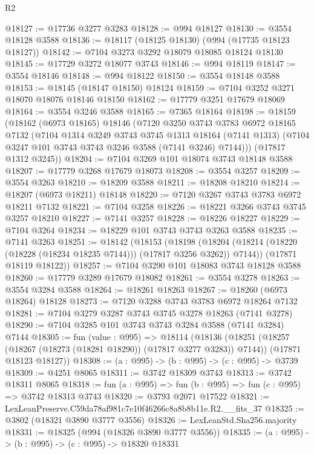 \begin{lexlean}{R2}
\begin{coremodule}
@18127 := @17736 @3277 @3283
@18128 := @994 @18127
@18130 := @3554 @18128 @3588
@18136 := @18117 (@18125 @18130) (@994 (@17735 @18123 @18127))
@18142 := @7104 @3273 @3292 @18079 @18085 @18124 @18130
@18145 := @17729 @3272 @18077 @3743
@18146 := @994 @18119
@18147 := @3554 @18146
@18148 := @994 @18122
@18150 := @3554 @18148 @3588
@18153 := @18145 (@18147 @18150) @18124
@18159 := @7104 @3252 @3271 @18070 @18076 @18146 @18150
@18162 := @17779 @3251 @17679 @18069
@18164 := @3554 @3246 @3588
@18165 := @7365 @18164
@18198 := @18159
    (@18162
      (@6973 @18165)
      @18146
      (@7120
        @3250
        @3743
        @3783
        @6972
        @18165
        @7132
        (@7104
          @1314
          @3249
          @3743
          @3745
          @1313
          @18164
          (@7141 @1313)
          (@7104 @3247 @101 @3743 @3743 @3246 @3588 (@7141 @3246) @7144)))
      (@17817 @1312 @3245))
@18204 := @7104 @3269 @101 @18074 @3743 @18148 @3588
@18207 := @17779 @3268 @17679 @18073
@18208 := @3554 @3257
@18209 := @3554 @3263
@18210 := @18209 @3588
@18211 := @18208 @18210
@18214 := @18207 (@6973 @18211) @18148
@18220 := @7120 @3267 @3743 @3783 @6972 @18211 @7132
@18221 := @7104 @3258
@18226 := @18221 @3266 @3743 @3745 @3257 @18210
@18227 := @7141 @3257
@18228 := @18226 @18227
@18229 := @7104 @3264
@18234 := @18229 @101 @3743 @3743 @3263 @3588
@18235 := @7141 @3263
@18251 := @18142
    (@18153
      (@18198 (@18204 (@18214 (@18220 (@18228 (@18234 @18235 @7144))) (@17817 @3256 @3262)) @7144))
      (@17871 @18119 @18122))
@18257 := @7104 @3290 @101 @18083 @3743 @18128 @3588
@18260 := @17779 @3289 @17679 @18082
@18261 := @3554 @3278
@18263 := @3554 @3284 @3588
@18264 := @18261 @18263
@18267 := @18260 (@6973 @18264) @18128
@18273 := @7120 @3288 @3743 @3783 @6972 @18264 @7132
@18281 := @7104 @3279 @3287 @3743 @3745 @3278 @18263 (@7141 @3278)
@18290 := @7104 @3285 @101 @3743 @3743 @3284 @3588 (@7141 @3284) @7144
@18305 := fun (value : @995) =>
  @18114
    (@18136
      (@18251 (@18257 (@18267 (@18273 (@18281 @18290)) (@17817 @3277 @3283)) @7144))
      (@17871 @18123 @18127))
@18308 := (a : @995) -> (b : @995) -> (c : @995) -> @3739
@18309 := @4251 @8065
@18311 := @3742 @18309 @3743
@18313 := @3742 @18311 @8065
@18318 := fun (a : @995) => fun (b : @995) => fun (c : @995) => @3742 @18313 @3743
@18320 := @3793 @2071 @17522
@18321 := LexLeanPreserve.C59da78af981c7e10f46266c8a8b8b11e.R2.__fits_37
@18325 := @3802 (@18321 @3890 @3777 @3556)
@18326 := LexLeanStd.Sha256.majority
@18331 := @18325 (@994 (@18326 @3890 @3777 @3556))
@18335 := (a : @995) -> (b : @995) -> (c : @995) -> @18320 @18331

\end{coremodule}
\end{lexlean}

